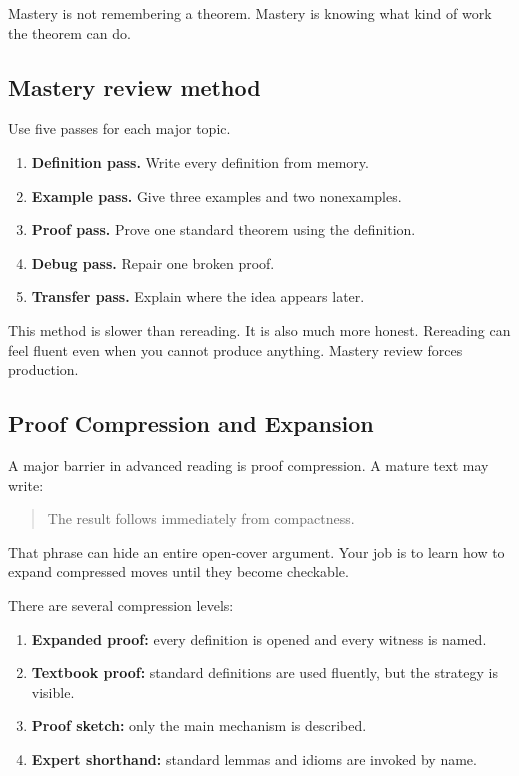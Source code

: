 \begin{focusbox}
Mastery is not remembering a theorem. Mastery is knowing what kind of work the theorem can do.
\end{focusbox}

\subsection{Mastery review method}

Use five passes for each major topic.

\begin{enumerate}
\item \textbf{Definition pass.} Write every definition from memory.
\item \textbf{Example pass.} Give three examples and two nonexamples.
\item \textbf{Proof pass.} Prove one standard theorem using the definition.
\item \textbf{Debug pass.} Repair one broken proof.
\item \textbf{Transfer pass.} Explain where the idea appears later.
\end{enumerate}

This method is slower than rereading. It is also much more honest. Rereading can feel fluent even when you cannot produce anything. Mastery review forces production.

\subsection{Proof Compression and Expansion}

A major barrier in advanced reading is proof compression. A mature text may write:

\begin{quote}
The result follows immediately from compactness.
\end{quote}

That phrase can hide an entire open-cover argument. Your job is to learn how to expand compressed moves until they become checkable.

There are several compression levels:

\begin{enumerate}
\item \textbf{Expanded proof:} every definition is opened and every witness is named.
\item \textbf{Textbook proof:} standard definitions are used fluently, but the strategy is visible.
\item \textbf{Proof sketch:} only the main mechanism is described.
\item \textbf{Expert shorthand:} standard lemmas and idioms are invoked by name.
\end{enumerate}

